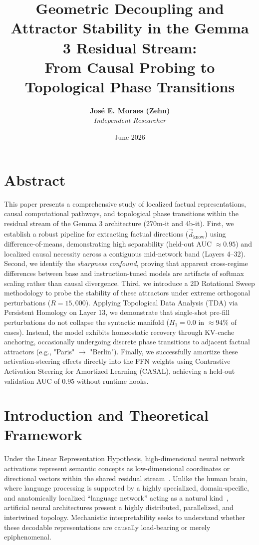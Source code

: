 \documentclass[11pt,a4paper,oneside]{memoir}
\title{\textbf{Geometric Decoupling and Attractor Stability in the Gemma 3 Residual Stream:\\ From Causal Probing to Topological Phase Transitions}}
\author{\textbf{José E. Moraes (Zehn)} \\ \textit{Independent Researcher} }
\date{June 2026}
\begin{document}
\maketitle

\chapter*{Abstract}
This paper presents a comprehensive study of localized factual representations, causal computational pathways, and topological phase transitions within the residual stream of the Gemma 3 architecture (270m-it and 4b-it). First, we establish a robust pipeline for extracting factual directions ($\vec{d}_{\text{know}}$) using difference-of-means, demonstrating high separability (held-out AUC $\approx 0.95$) and localized causal necessity across a contiguous mid-network band (Layers 4--32). Second, we identify the \textit{sharpness confound}, proving that apparent cross-regime differences between base and instruction-tuned models are artifacts of softmax scaling rather than causal divergence. Third, we introduce a 2D Rotational Sweep methodology to probe the stability of these attractors under extreme orthogonal perturbations ($R = 15,000$). Applying Topological Data Analysis (TDA) via Persistent Homology on Layer 13, we demonstrate that single-shot pre-fill perturbations do not collapse the syntactic manifold ($H_1 = 0.0$ in $\approx 94\%$ of cases). Instead, the model exhibits homeostatic recovery through KV-cache anchoring, occasionally undergoing discrete phase transitions to adjacent factual attractors (e.g., "Paris" $\to$ "Berlin"). Finally, we successfully amortize these activation-steering effects directly into the FFN weights using Contrastive Activation Steering for Amortized Learning (CASAL), achieving a held-out validation AUC of $0.95$ without runtime hooks.


\newpage

\chapter{Introduction and Theoretical Framework}
\label{sec:introduction}

Under the Linear Representation Hypothesis, high-dimensional neural network activations represent semantic concepts as low-dimensional coordinates or directional vectors within the shared residual stream~\cite{lieberum2024gemma, ferrando2025do}. Unlike the human brain, where language processing is supported by a highly specialized, domain-specific, and anatomically localized ``language network'' acting as a natural kind~\cite{fedorenko2024language}, artificial neural architectures present a highly distributed, parallelized, and intertwined topology. Mechanistic interpretability seeks to understand whether these decodable representations are causally load-bearing or merely epiphenomenal.
\end{document}
